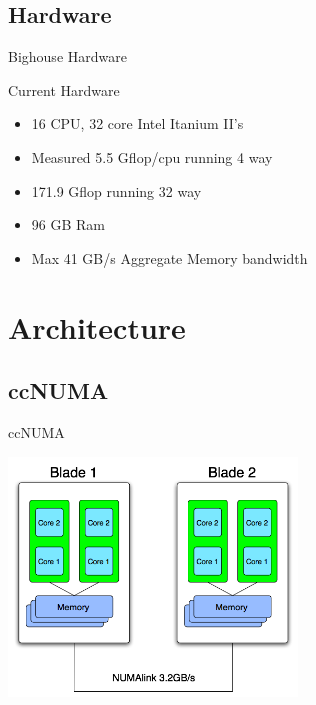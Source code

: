 \documentclass{beamer}
\begin{document}
  \subsection {Hardware}
  \begin{frame}{Bighouse Hardware}
   \begin{block}{Current Hardware}
   \begin{itemize}
    \item<2->16 CPU, 32 core Intel Itanium II's
    \item<3->Measured 5.5 Gflop/cpu running 4 way
    \item<3->171.9 Gflop running 32 way
    \item<4->96 GB Ram
    \item<5->Max 41 GB/s Aggregate Memory bandwidth
   \end{itemize}
   \end{block}
  \end{frame}

  \section{Architecture}
  \subsection{ccNUMA}
  \begin{frame}{ccNUMA}
   \begin{center}\includegraphics[height=2.5in]{numa}\end{center}
  \end{frame}
\end{document}
